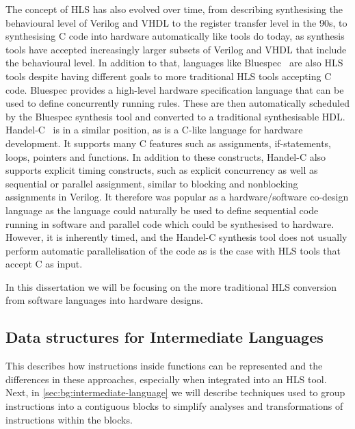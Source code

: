 The concept of \gls{HLS} has also evolved over time, from describing
synthesising the behavioural level of Verilog and VHDL to the register transfer
level in the 90s, to synthesising C code into hardware automatically like tools
do today, as synthesis tools have accepted increasingly larger subsets of
Verilog and VHDL that include the behavioural level.  In addition to that,
languages like Bluespec~\cite{nikhil04_bsv} are also \gls{HLS} tools despite
having different goals to more traditional \gls{HLS} tools accepting C code.
Bluespec provides a high-level hardware specification language that can be used
to define concurrently running rules.  These are then automatically scheduled by
the Bluespec synthesis tool and converted to a traditional synthesisable
\gls{HDL}.  Handel-C~\cite{aubury96_handel_c_languag_refer_guide,bowen98_hclrm}
is in a similar position, as is a C-like language for hardware development.  It
supports many C features such as assignments, if-statements, loops, pointers and
functions.  In addition to these constructs, Handel-C also supports explicit
timing constructs, such as explicit concurrency as well as sequential or
parallel assignment, similar to blocking and nonblocking assignments in Verilog.
It therefore was popular as a hardware/software co-design language as the
language could naturally be used to define sequential code running in software
and parallel code which could be synthesised to hardware.  However, it is
inherently timed, and the Handel-C synthesis tool does not usually perform
automatic parallelisation of the code as is the case with \gls{HLS} tools that
accept C as input.

In this dissertation we will be focusing on the more traditional \gls{HLS}
conversion from software languages into hardware designs.

\subsection{Data structures for Intermediate Languages}%
\label{sec:bg:data-structures-for-intermediate-languages}

This  describes how
instructions inside functions can be represented and the differences in these
approaches, especially when integrated into an \gls{HLS} tool.  Next, in
\cref{sec:bg:intermediate-language} we will describe techniques used to group
instructions into a contiguous blocks to simplify analyses and transformations
of instructions within the blocks.


